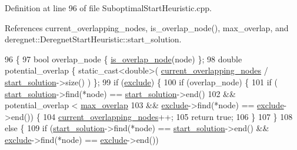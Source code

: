 Definition at line 96 of file Suboptimal\+Start\+Heuristic.\+cpp.



References current\+\_\+overlapping\+\_\+nodes, is\+\_\+overlap\+\_\+node(), max\+\_\+overlap, and deregnet\+::\+Deregnet\+Start\+Heuristic\+::start\+\_\+solution.


\begin{DoxyCode}
96                                                        \{
97     \textcolor{keywordtype}{bool} overlap\_node \{ \hyperlink{classderegnet_1_1SuboptimalStartHeuristic_a911e7e3003bbf92b170a943e714b014e}{is\_overlap\_node}(node) \};
98     \textcolor{keywordtype}{double} potential\_overlap \{ \textcolor{keyword}{static\_cast<}\textcolor{keywordtype}{double}\textcolor{keyword}{>}( \hyperlink{classderegnet_1_1SuboptimalStartHeuristic_a422ca9127a469117bab51ae3eb2fbdcf}{current\_overlapping\_nodes} / 
      \hyperlink{classderegnet_1_1DeregnetStartHeuristic_a7450e11ca0a265b055f95e7832b65e2f}{start\_solution}->size() ) \};
99     \textcolor{keywordflow}{if} (\hyperlink{classderegnet_1_1DeregnetStartHeuristic_aa22c6581cd404bf7ac325850b28dc951}{exclude}) \{
100         \textcolor{keywordflow}{if} (overlap\_node) \{
101             \textcolor{keywordflow}{if} (   \hyperlink{classderegnet_1_1DeregnetStartHeuristic_a7450e11ca0a265b055f95e7832b65e2f}{start\_solution}->find(*node) == \hyperlink{classderegnet_1_1DeregnetStartHeuristic_a7450e11ca0a265b055f95e7832b65e2f}{start\_solution}->end()
102                 && potential\_overlap < \hyperlink{classderegnet_1_1SuboptimalStartHeuristic_ab7da09c5dc0c3fd13e19d254319ab3ba}{max\_overlap}
103                 && \hyperlink{classderegnet_1_1DeregnetStartHeuristic_aa22c6581cd404bf7ac325850b28dc951}{exclude}->find(*node) == \hyperlink{classderegnet_1_1DeregnetStartHeuristic_aa22c6581cd404bf7ac325850b28dc951}{exclude}->end()) \{
104                 \hyperlink{classderegnet_1_1SuboptimalStartHeuristic_a422ca9127a469117bab51ae3eb2fbdcf}{current\_overlapping\_nodes}++;
105                 \textcolor{keywordflow}{return} \textcolor{keyword}{true};
106             \}
107         \}
108         \textcolor{keywordflow}{else} \{
109             \textcolor{keywordflow}{if} (\hyperlink{classderegnet_1_1DeregnetStartHeuristic_a7450e11ca0a265b055f95e7832b65e2f}{start\_solution}->find(*node) == \hyperlink{classderegnet_1_1DeregnetStartHeuristic_a7450e11ca0a265b055f95e7832b65e2f}{start\_solution}->end() && 
      \hyperlink{classderegnet_1_1DeregnetStartHeuristic_aa22c6581cd404bf7ac325850b28dc951}{exclude}->find(*node) == \hyperlink{classderegnet_1_1DeregnetStartHeuristic_aa22c6581cd404bf7ac325850b28dc951}{exclude}->end())

\end{DoxyCode}
